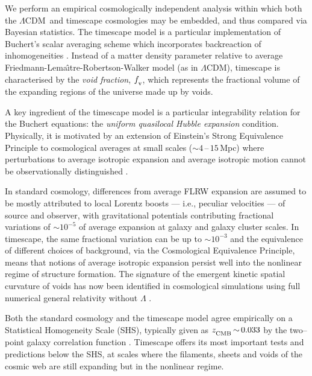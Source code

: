 \documentclass[fleqn,usenatbib]{mnras}
\newcommand{\LA}{\Lambda}
\newcommand{\LCDM}{$\LA$CDM}
\newcommand{\goesas}{\mathop{\sim}\limits}
\newcommand{\Ns}[1]{_{\lower2pt\hbox{$\scriptstyle\rm#1$}}}
\begin{document}
We perform an empirical cosmologically independent analysis within which both the \LCDM\ and timescape cosmologies may be embedded, and thus compared via Bayesian statistics. The timescape model is a particular implementation of Buchert’s scalar averaging scheme which incorporates backreaction of inhomogeneities \citep{Buchert_2000, Buchert_2001, Buchert_2020, Wiltshire_2014_cosmic}. Instead of a matter density parameter relative to average Friedmann-Lema\^{\i}tre-Robertson-Walker model (as in $\Lambda$CDM), timescape is characterised by the \textit{void fraction}, $f\Ns{v}$, which represents the fractional volume of the expanding regions of the universe made up by voids.

A key ingredient of the timescape model is a particular integrability relation for the Buchert equations: the {\em uniform quasilocal Hubble expansion} condition. Physically, it is motivated by an extension of Einstein's Strong Equivalence Principle to cosmological averages at small scales ($\goesas4\,$--$\,15\,$Mpc) where perturbations to average isotropic expansion and average isotropic motion cannot be observationally distinguished \citep{Wiltshire_2008}. 

In standard cosmology, differences from average FLRW expansion are assumed to be mostly attributed to local Lorentz boosts --- i.e., peculiar velocities --- of source and observer, with gravitational potentials contributing fractional variations of $\goesas10^{-5}$ of average expansion at galaxy and galaxy cluster scales. In timescape, the same fractional variation can be up to $\goesas10^{-3}$ and the equivalence of different choices of background, via the Cosmological Equivalence Principle, means that notions of average isotropic expansion persist well into the nonlinear regime of structure formation. The signature of the emergent kinetic spatial curvature of voids has now been identified in cosmological simulations using full numerical general relativity without $\Lambda$ \citep{Williams_2024}. 

Both the standard cosmology and the timescape model agree empirically on a Statistical Homogeneity Scale (SHS), typically given as $z \Ns {CMB} \goesas 0.033$ by the two--point galaxy correlation function \citep{Hogg_2005, Scrimgeour_2012, Dam_2017}. Timescape offers its most important tests and predictions below the SHS, at scales where the filaments, sheets and voids of the cosmic web are still expanding but in the nonlinear regime.
\end{document}
